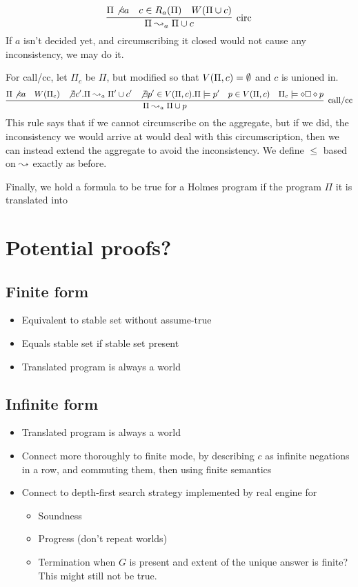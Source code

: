 \[
	\infer[\textrm{circ}]{\Pi \stepass_a \Pi \cup c}{\Pi \not \decides a & c \in \circset_a(\Pi) & W(\Pi \cup c)}
\]
If $a$ isn't decided yet, and circumscribing it closed would not cause any inconsistency, we may do it.

For call/cc, let $\Pi_c$ be $\Pi$, but modified so that $V(\Pi, c) = \emptyset$ and $c$ is unioned in.
\[\small
	\infer[\textrm{call/cc}]{\Pi \stepass_a \Pi \cup p}{\Pi \not \decides a & \world{\Pi_c} & \not \exists c'. \Pi \stepass_a \Pi' \cup c' & \not \exists p' \in \viol{\Pi}{c}. \Pi \models p' & p \in \viol{\Pi}{c} & \Pi_c \models \dia \boks \dia p}
\]
This rule says that if we cannot circumscribe on the aggregate, but if we did, the inconsistency we would arrive at would deal with this circumscription, then we can instead extend the aggregate to avoid the inconsistency.
We define $\leq$ based on $\leadsto$ exactly as before.

Finally, we hold a formula to be true for a Holmes program if the program $\Pi$ it is translated into

\section{Potential proofs?}
\subsection{Finite form}
\begin{itemize}
	\item Equivalent to stable set without assume-true
	\item Equals stable set if stable set present
	\item Translated program is always a world
\end{itemize}
\subsection{Infinite form}
\begin{itemize}
	\item Translated program is always a world
	\item Connect more thoroughly to finite mode, by describing $c$ as infinite negations in a row, and commuting them, then using finite semantics
	\item Connect to depth-first search strategy implemented by real engine for
		\begin{itemize}
			\item Soundness
			\item Progress (don't repeat worlds)
			\item Termination when $G$ is present and extent of the unique answer is finite? This might still not be true.
		\end{itemize}
\end{itemize}
